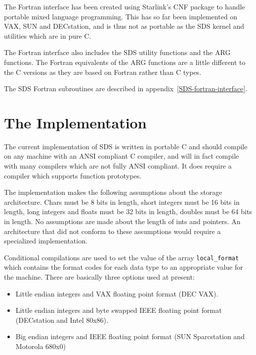 The Fortran interface has been created using Starlink's CNF package to handle
portable mixed language programming. This has so far been implemented on
VAX, SUN and DECstation, and is thus not as portable as the SDS kernel and
utilities which are in pure C.

The Fortran interface also includes the SDS utility functions and the ARG
functions. The Fortran equivalents of the ARG functions are a little different
to the C versions as they are based on Fortran rather than C types.

The SDS Fortran subroutines are described in
appendix~\ref{SDS-fortran-interface}.

\section{The Implementation}

The current implementation of SDS is written in portable C and should compile
on any machine with an ANSI compliant C compiler, and will in fact compile
with many compilers which are not fully ANSI compliant. It does require a
compiler which supports function prototypes.

The implementation makes the following assumptions about the storage
architecture. Chars must be 8 bits in length, short integers must be 16 bits in
length, long integers and floats must be 32 bits in length, doubles must be 64
bits in length. No assumptions are made about the length of ints and pointers.
An architecture that did not conform to these assumptions would require a
specialized implementation.

Conditional compilations are used to set the value of the array
\verb$local_format$ which contains the format codes for each data type to an
appropriate value for the machine. There
are basically three options used at present:

\begin{itemize}

\item Little endian integers and VAX floating point format (DEC VAX).

\item Little endian integers and byte swapped IEEE floating point format
(DECstation and Intel 80x86).

\item Big endian integers and IEEE floating point format (SUN Sparcstation and
Motorola 680x0)

\end{itemize} 

